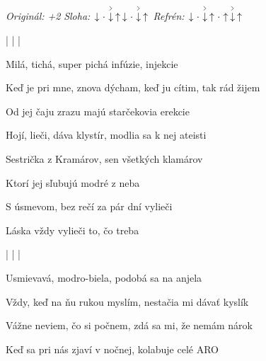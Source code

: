 \begin{song}


\begin{headerbox}
\RaiseBoxWithAccents
\textit{Originál: +2} \quad
\textit{Sloha:} $\Down\Miss\AccentDown\Up \Down\Miss\AccentDown\Up$ \quad
\textit{Refrén:} $\Down\Miss\AccentDown\Up\Miss\Up\AccentDown\Up$
\end{headerbox}

\begin{hchordbox}
\end{hchordbox}

\Large

\bigskip

   |    |    |  

\bigskip

Milá, tichá, super pichá infúzie, injekcie \par
{}Keď je pri mne, znova dýcham, keď ju cítim, tak rád žijem \par
{}Od jej čaju zrazu majú starčekovia erekcie \par
{}Hojí, lieči, dáva klystír, modlia sa k nej ateisti \par
{} \par

\bigskip

\begin{chorusbox}{\Refren}
Sestrička z Kramárov, sen všetkých klamárov \par
{} Ktorí jej sľubujú modré z neba \par
S úsmevom, bez rečí za pár dní vylieči \par
{} Láska vždy vylieči to, čo treba  \par
\end{chorusbox}

\bigskip

   |    |    |  

\bigskip

Usmievavá, modro-biela, podobá sa na anjela \par
{}Vždy, keď na ňu rukou myslím, nestačia mi dávať kyslík \par
{}Vážne neviem, čo si počnem, zdá sa mi, že nemám nárok \par
{}Keď sa pri nás zjaví v nočnej, kolabuje celé ARO \par
{} \par


\end{song}
